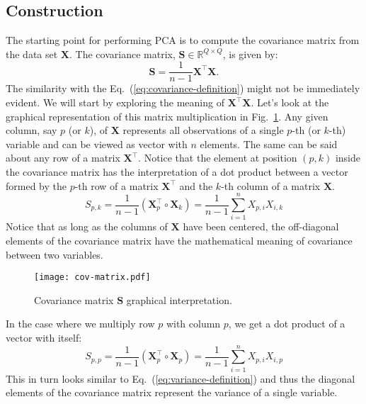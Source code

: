 \documentclass[10pt,twocolumn]{article}
\begin{document}
\subsection{Construction}

The starting point for performing PCA is to compute the covariance matrix from the data set $\mathbf{X}$. The covariance matrix, $\mathbf{S} \in \mathbb{R}^{Q \times Q}$, is given by:
\begin{equation}\label{eq:cov-matrix}
\mathbf{S} = \frac{1}{n-1} \mathbf{X}^{\top} \mathbf{X}.
\end{equation}
The similarity with the Eq.~(\ref{eq:covariance-definition}) might not be immediately evident. We will start by exploring the meaning of $\mathbf{X}^{\top} \mathbf{X}$. Let's look at the graphical representation of this matrix multiplication in Fig.~\ref{fig:covariance-matrix}. Any given column, say $p$ (or $k$), of $\mathbf{X}$ represents all observations of a single $p$-th (or $k$-th) variable and can be viewed as vector with $n$ elements. The same can be said about any row of a matrix $\mathbf{X}^{\top}$. Notice that the element at position $(p,k)$ inside the covariance matrix has the interpretation of a dot product between a vector formed by the $p$-th row of a matrix $\mathbf{X}^{\top}$ and the $k$-th column of a matrix $\mathbf{X}$.
\begin{equation}
S_{p,k} = \frac{1}{n-1} (\mathbf{X}_p^{\top} \circ \mathbf{X}_k) = \frac{1}{n-1} \sum_{i=1}^n X_{p, i} X_{i, k}
\end{equation}
Notice that as long as the columns of $\mathbf{X}$ have been centered, the off-diagonal elements of the covariance matrix have the mathematical meaning of covariance between two variables.
\begin{figure}[t]
\centering\texttt{[image: cov-matrix.pdf]}
\caption{Covariance matrix $\mathbf{S}$ graphical interpretation.}
\label{fig:covariance-matrix}
\end{figure}
In the case where we multiply row $p$ with column $p$, we get a dot product of a vector with itself:
\begin{equation}
S_{p,p} = \frac{1}{n-1} ( \mathbf{X}_p^{\top} \circ \mathbf{X}_p) = \frac{1}{n-1} \sum_{i=1}^n X_{p, i} X_{i, p}
\end{equation}
This in turn looks similar to Eq.~(\ref{eq:variance-definition}) and thus the diagonal elements of the covariance matrix represent the variance of a single variable.
\end{document}
